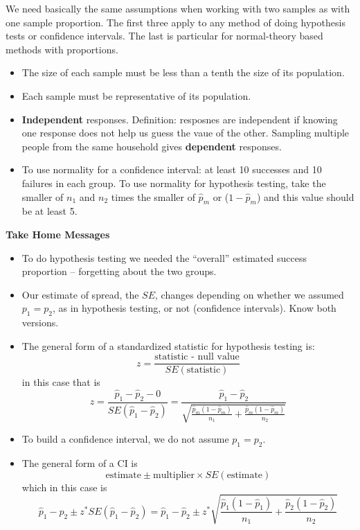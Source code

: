   We need basically the same assumptions when working with two samples
  as with one sample proportion.  The first three apply to any method
  of doing hypothesis tests or confidence intervals.  The last is
  particular for normal-theory based methods with proportions. 
  \begin{itemize}
     \item The size of each sample must be less than a tenth the size
       of its population.
     \item Each sample must be representative of its population. 
     \item {\bf Independent} responses.  Definition: resposnes are
       independent if knowing one response does not help us guess the
       vaue of the other.  Sampling multiple people from the same
       household gives {\bf dependent} responses.
     \item To use normality for a confidence interval: at least 10
       successes and 10 failures in each group.  To use normality for
       hypothesis testing, take the smaller of $n_1$ and $n_2$ times
       the smaller of $\widehat{p}_m$ or ($1-\widehat{p}_m$) and this
       value should be at least 5.\vspace{1in}
  \end{itemize}



\begin{center}
  {\large\bf Take Home Messages}
\end{center}

\begin{itemize}
 \item  To do hypothesis testing we needed the ``overall'' estimated
   success proportion -- forgetting about the two groups. 
 \item Our estimate of spread, the $SE$, changes depending on whether
   we assumed $p_1=p_2$, as in hypothesis testing, or not (confidence
   intervals). Know both versions.
 \item  The general form of a standardized statistic for hypothesis
   testing is:
     $$z = \frac{\mbox{statistic - null value}}{SE(\mbox{statistic})}$$
in this case that is
$$ z = \frac{\widehat{p}_1 - \widehat{p}_2 -0}{ SE(\widehat{p}_1 -
  \widehat{p}_2)} = \frac{\widehat{p}_1 - \widehat{p}_2} 
   {\sqrt{\frac{\widehat{p}_m(1-\widehat{p}_m)}{n_1} +
    \frac{\widehat{p}_m(1-\widehat{p}_m)}{n_2}}}$$
\item To build a confidence interval, we do not assume ${p}_1 ={p}_2$.
\item The general form of a CI is
$$ \mbox{estimate} \pm \mbox{multiplier} \times SE(\mbox{estimate})$$
    which in this case is
  $$ \widehat{p}_1 - \widehat{p}_2 \pm z^* SE(\widehat{p}_1 -
  \widehat{p}_2) = \widehat{p}_1 - \widehat{p}_2 \pm z^* 
\sqrt{\frac{\widehat{p}_1(1 - \widehat{p}_1)}{n_1} + 
      \frac{\widehat{p}_2(1 - \widehat{p}_2)}{n_2}}$$
\end{itemize}


